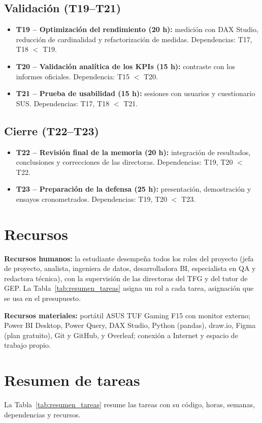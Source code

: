 \documentclass[12pt, a4paper, oneside]{report}
\begin{document}
\subsection{Validación (T19--T21)}
\begin{itemize}
    \item \textbf{T19 -- Optimización del rendimiento (20 h):} medición con DAX Studio, reducción de cardinalidad y refactorización de medidas. Dependencias: T17, T18 $<$ T19.
    \item \textbf{T20 -- Validación analítica de los KPIs (15 h):} contraste con los informes oficiales. Dependencia: T15 $<$ T20.
    \item \textbf{T21 -- Prueba de usabilidad (15 h):} sesiones con usuarios y cuestionario SUS. Dependencias: T17, T18 $<$ T21.
\end{itemize}

\subsection{Cierre (T22--T23)}
\begin{itemize}
    \item \textbf{T22 -- Revisión final de la memoria (20 h):} integración de resultados, conclusiones y correcciones de las directoras. Dependencias: T19, T20 $<$ T22.
    \item \textbf{T23 -- Preparación de la defensa (25 h):} presentación, demostración y ensayos cronometrados. Dependencias: T19, T20 $<$ T23.
\end{itemize}

\section{Recursos}
\textbf{Recursos humanos:} la estudiante desempeña todos los roles del proyecto (jefa de proyecto, analista, ingeniera de datos, desarrolladora BI, especialista en QA y redactora técnica), con la supervisión de las directoras del TFG y del tutor de GEP. La Tabla~\ref{tab:resumen_tareas} asigna un rol a cada tarea, asignación que se usa en el presupuesto.

\textbf{Recursos materiales:} portátil ASUS TUF Gaming F15 con monitor externo; Power BI Desktop, Power Query, DAX Studio, Python (pandas), draw.io, Figma (plan gratuito), Git y GitHub, y Overleaf; conexión a Internet y espacio de trabajo propio.

\section{Resumen de tareas}
La Tabla~\ref{tab:resumen_tareas} resume las tareas con su código, horas, semanas, dependencias y recursos.
\end{document}

